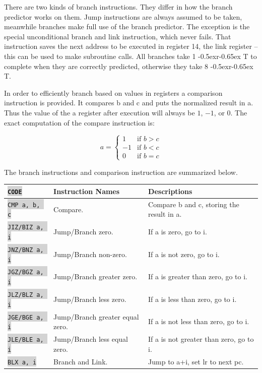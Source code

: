 \documentclass{article}
\newcommand{\vnscode}[1]{\colorbox{lightgray}{\lstinline[language=vns]{#1}}}
\newcommand{\RT}{\lower-0.5ex\hbox{r}\kern-0.65ex T}
\begin{document}
There are two kinds of branch instructions. They differ in how the branch
predictor works on them. Jump instructions are always assumed to be taken,
meanwhile branches make full use of the branch predictor. The exception is the
special unconditional branch and link instruction, which never fails. That
instruction saves the next address to be executed in register 14, the link
register -- this can be used to make subroutine calls. All branches take 1 \RT
to complete when they are correctly predicted, otherwise they take 8 \RT.

In order to efficiently branch based on values in registers a comparison
instruction is provided. It compares b and c and puts the normalized result in
a. Thus the value of the a register after execution will always be $1$, $-1$, or
$0$. The exact computation of the compare instruction is:

\begin{displaymath}
    a = \begin{cases}
        1 & \mbox{if } b > c \\
        -1 & \mbox{if } b < c \\
        0 & \mbox{if } b = c \end{cases}
\end{displaymath}

The branch instructions and comparison instruction are summarized below.

\begin{minipage}{\textwidth}
\label{table:branch}
\centering
\begin{tabular}{lll}
    \hline \vnscode{CODE} & Instruction Names & Descriptions \\ \hline
    \vnscode{CMP a, b, c} & Compare. & Compare b and c, storing the result in a. \\
    \vnscode{JIZ/BIZ a, i} & Jump/Branch zero. & If a is zero, go to i. \\
    \vnscode{JNZ/BNZ a, i} & Jump/Branch non-zero. & If a is not zero, go to i. \\
    \vnscode{JGZ/BGZ a, i} & Jump/Branch greater zero. & If a is greater than zero, go to i. \\
    \vnscode{JLZ/BLZ a, i} & Jump/Branch less zero. & If a is less than zero, go to i. \\
    \vnscode{JGE/BGE a, i} & Jump/Branch greater equal zero. & If a is not less than zero, go to i. \\
    \vnscode{JLE/BLE a, i} & Jump/Branch less equal zero. & If a is not greater than zero, go to i. \\
    \vnscode{BLX a, i} & Branch and Link. & Jump to a+i, set lr to next pc. \\
\end{tabular}
\end{minipage}
\end{document}
